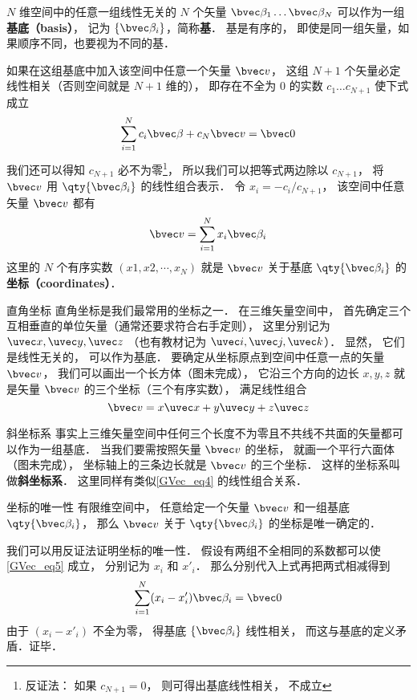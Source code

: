$N$ 维空间中的任意一组线性无关的 $N$ 个矢量 $\bvec \beta_1\dots \bvec \beta_N$ 可以作为一组\textbf{基底（basis）}， 记为 $\{\bvec \beta_i\}$，简称\textbf{基}． 基是有序的， 即使是同一组矢量，如果顺序不同，也要视为不同的基．

如果在这组基底中加入该空间中任意一个矢量 $\bvec v$， 这组 $N+1$ 个矢量必定线性相关（否则空间就是 $N+1$ 维的）， 即存在不全为 0 的实数 $c_1\dots c_{N+1}$ 使下式成立
\begin{equation}
\sum_{i=1}^{N} c_i \bvec \beta + c_N \bvec v = \bvec 0
\end{equation}
我们还可以得知 $c_{N+1}$ 必不为零\footnote{反证法： 如果 $c_{N+1} = 0$， 则可得出基底线性相关， 不成立}， 所以我们可以把等式两边除以 $c_{N+1}$， 将 $\bvec v$ 用 $\qty{\bvec \beta_i}$ 的线性组合表示． 令 $x_i = -c_i/c_{N+1}$， 该空间中任意矢量 $\bvec v$ 都有
\begin{equation}\label{GVec_eq5}
\bvec v = \sum_{i=1}^N x_i \bvec \beta_i
\end{equation}
这里的 $N$ 个有序实数 $(x1, x2, \cdots, x_N)$ 就是 $\bvec v$ 关于基底 $\qty{\bvec \beta_i}$ 的\textbf{坐标（coordinates）}．

\begin{example}{直角坐标}
直角坐标是我们最常用的坐标之一． 在三维矢量空间中， 首先确定三个互相垂直的单位矢量（通常还要求符合右手定则）， 这里分别记为 $\uvec x, \uvec y, \uvec z$ （也有教材记为 $\uvec i, \uvec j, \uvec k$）． 显然， 它们是线性无关的， 可以作为基底． 要确定从坐标原点到空间中任意一点的矢量 $\bvec v$， 我们可以画出一个长方体（图未完成）， 它沿三个方向的边长 $x, y, z$ 就是矢量 $\bvec v$ 的三个坐标（三个有序实数）， 满足线性组合
\begin{equation}\label{GVec_eq4}
\bvec v = x\uvec x + y\uvec y + z\uvec z
\end{equation}
\end{example}

\begin{example}{斜坐标系}
事实上三维矢量空间中任何三个长度不为零且不共线不共面的矢量都可以作为一组基底． 当我们要需按照矢量 $\bvec v$ 的坐标， 就画一个平行六面体（图未完成）， 坐标轴上的三条边长就是 $\bvec v$ 的三个坐标． 这样的坐标系叫做\textbf{斜坐标系}． 这里同样有类似\autoref{GVec_eq4} 的线性组合关系．
\end{example}

\begin{theorem}{坐标的唯一性}
有限维空间中， 任意给定一个矢量 $\bvec v$ 和一组基底 $\qty{\bvec \beta_i}$， 那么 $\bvec v$ 关于 $\qty{\bvec \beta_i}$ 的坐标是唯一确定的．
\end{theorem}
我们可以用反证法证明坐标的唯一性． 假设有两组不全相同的系数都可以使\autoref{GVec_eq5} 成立， 分别记为 $x_i$ 和 $x'_i$． 那么分别代入上式再把两式相减得到
\begin{equation}
\sum_{i=1}^N (x_i-x'_i) \bvec \beta_i = \bvec 0
\end{equation}
由于 $(x_i-x'_i)$ 不全为零， 得基底 $\{\bvec \beta_i\}$ 线性相关， 而这与基底的定义矛盾．证毕．


